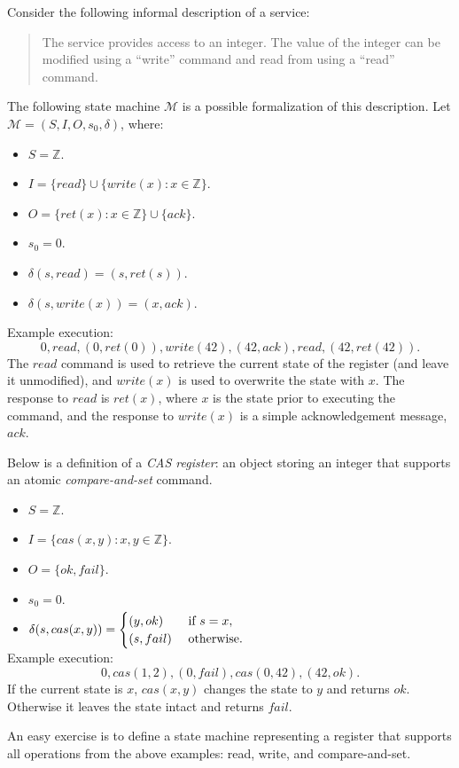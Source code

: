 \documentclass[12pt,a4paper,en]{pracamgr}
\newcommand{\ti}[1]{\textit{#1}}
\newcommand{\mc}[1]{\mathcal{#1}}
\newcommand{\mbb}[1]{\mathbb{#1}}
\begin{document}
\begin{ex}
    Consider the following informal description of a service:
    \begin{quote}
        The service provides access to an integer. The value of the integer can be modified using a ``write'' command and read from using a ``read'' command.
    \end{quote}
    The following state machine $\mc M$ is a possible formalization of this description. Let $\mc M = (S, I, O, s_0, \delta)$, where:
	\begin{itemize}
		\item $S = \mbb Z$.
		\item $I = \{read\} \cup \{write(x): x \in \mbb Z\}$.
		\item $O = \{ret(x): x \in \mbb Z\} \cup \{ack\}$.
		\item $s_0 = 0$.
		\item $\delta(s, read) = (s, ret(s))$.
		\item $\delta(s, write(x)) = (x, ack)$.
	\end{itemize}

	Example execution:
	$$ 0, read, (0, ret(0)), write(42), (42, ack), read, (42, ret(42)). $$
	The $read$ command is used to retrieve the current state of the register (and leave it unmodified), and $write(x)$ is used to overwrite the state with $x$. The response to $read$ is $ret(x)$, where $x$ is the state prior to executing the command, and the response to $write(x)$ is a simple acknowledgement message, $ack$.
\end{ex}

\begin{ex}\label{cas-sm}
	Below is a definition of a \ti{CAS register}: an object storing an integer that supports an atomic \ti{compare-and-set} command.
	\begin{itemize}
		\item $S = \mbb Z$.
		\item $I = \{cas(x, y): x, y \in \mbb Z\}$.
		\item $O = \{ok, fail\}$.
		\item $s_0 = 0$.
		\item $\delta(s, cas(x, y)) = \smash{\begin{cases} (y, ok)&\text{ if }s = x,\\ (s, fail)&\text{ otherwise.}\end{cases}}$
	\end{itemize}

	Example execution:
	$$ 0, cas(1, 2), (0, fail), cas(0, 42), (42, ok). $$
	If the current state is $x$, $cas(x, y)$ changes the state to $y$ and returns $ok$. Otherwise it leaves the state intact and returns $fail$.
\end{ex}
An easy exercise is to define a state machine representing a register that supports all operations from the above examples: read, write, and compare-and-set.
\end{document}
